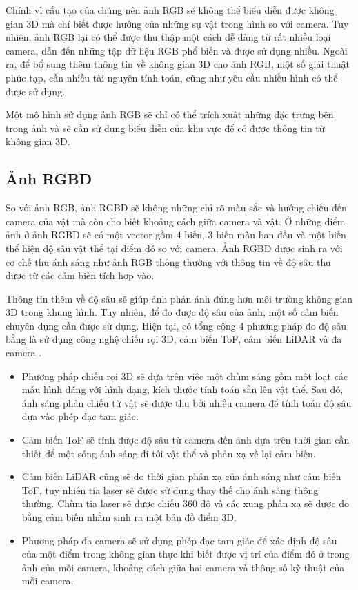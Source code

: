 Chính vì cấu tạo của chúng nên ảnh RGB sẽ không thể biểu diễn được không gian 3D mà chỉ biết được hướng của những sự vật trong hình so với camera. Tuy nhiên, ảnh RGB lại có thể được thu thập một cách dễ dàng từ rất nhiều loại camera, dẫn đến những tập dữ liệu RGB phổ biến và được sử dụng nhiều. Ngoài ra, để bổ sung thêm thông tin về không gian 3D cho ảnh RGB, một số giải thuật phức tạp, cần nhiều tài nguyên tính toán, cũng như yêu cầu nhiều hình có thể được sử dụng. 

Một mô hình sử dụng ảnh RGB sẽ chỉ có thể trích xuất những đặc trưng bên trong ảnh và sẽ cần sử dụng biểu diễn của khu vực để có được thông tin từ không gian 3D.

\subsection{Ảnh RGBD}

So với ảnh RGB, ảnh RGBD sẽ không những chỉ rõ màu sắc và hướng chiếu đến camera của vật mà còn cho biết khoảng cách giữa camera và vật. Ở những điểm ảnh ở ảnh RGBD sẽ có một vector gồm 4 biến, 3 biến màu ban đầu và một biến thể hiện độ sâu vật thể tại điểm đó so với camera. Ảnh RGBD được sinh ra với cơ chế thu ánh sáng như ảnh RGB thông thường với thông tin về độ sâu thu được từ các cảm biến tích hợp vào.

Thông tin thêm về độ sâu sẽ giúp ảnh phản ánh đúng hơn môi trường không gian 3D trong khung hình. Tuy nhiên, để đo được độ sâu của ảnh, một số cảm biến chuyên dụng cần được sử dụng. Hiện tại, có tổng cộng 4 phương pháp đo độ sâu bằng là sử dụng công nghệ chiếu rọi 3D, cảm biến ToF, cảm biến LiDAR và đa camera \cite{lopes2022survey}.
\begin{itemize}
    \item Phương pháp chiếu rọi 3D sẽ dựa trên việc một chùm sáng gồm một loạt các mẫu hình dáng với hình dạng, kích thước tính toán sẵn lên vật thể. Sau đó, ánh sáng phản chiếu từ vật sẽ được thu bởi nhiều camera để tính toán độ sâu dựa vào phép đạc tam giác.
    \item Cảm biến ToF sẽ tính được độ sâu từ camera đến ảnh dựa trên thời gian cần thiết để một sóng ánh sáng đi tới vật thể và phản xạ về lại cảm biến. 
    \item Cảm biến LiDAR cũng sẽ đo thời gian phản xạ của ánh sáng như cảm biến ToF, tuy nhiên tia laser sẽ được sử dụng thay thế cho ánh sáng thông thường. Chùm tia laser sẽ được chiếu 360 độ và các xung phản xạ sẽ được đo bằng cảm biến nhằm sinh ra một bản đồ điểm 3D.
    \item Phương pháp đa camera sẽ sử dụng phép đạc tam giác để xác định độ sâu của một điểm trong không gian thực khi biết được vị trí của điểm đó ở trong ảnh của mỗi camera, khoảng cách giữa hai camera và thông số kỹ thuật của mỗi camera.
\end{itemize}

